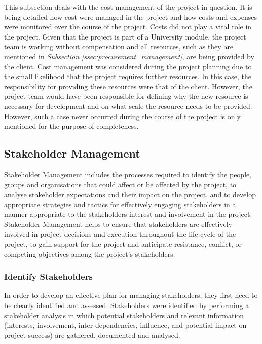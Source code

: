 This subsection deals with the cost management of the project in question. It is being detailed how cost were managed in the project and how costs and expenses were monitored over the course of the project.
\newline
Costs did not play a vital role in the project. Given that the project is part of a University module, the project team is working without compensation and all resources, such as they are mentioned in \textit{Subsection \ref{ssec:procurement_management}}, are being provided by the client.
\newline
Cost management was considered during the project planning due to the small likelihood that the project requires further resources. In this case, the responsibility for providing these resources were that of the client. However, the project team would have been responsible for defining why the new resource is necessary for development and on what scale the resource needs to be provided. However, such a case never occurred during the course of the project is only mentioned for the purpose of completeness.



\subsection{Stakeholder Management}
\label{ssec:stakeholder_management}

Stakeholder Management includes the processes required to identify the people, groups and organisations that could affect or be affected by the project, to analyse stakeholder expectations and their impact on the project, and to develop appropriate strategies and tactics for effectively engaging stakeholders in a manner appropriate to the stakeholders interest and involvement in the project. Stakeholder Management helps to ensure that stakeholders are effectively involved in project decisions and execution throughout the life cycle of the project, to gain support for the project and anticipate resistance, conflict, or competing objectives among the project’s stakeholders.

\subsubsection{Identify Stakeholders}
\label{sssec:identify_stakeholders}

In order to develop an effective plan for managing stakeholders, they first need to be clearly identified and assessed. Stakeholders were identified by performing a stakeholder analysis in which potential stakeholders and relevant information (interests, involvement, inter dependencies, influence, and potential impact on project success) are gathered, documented and analysed. 


